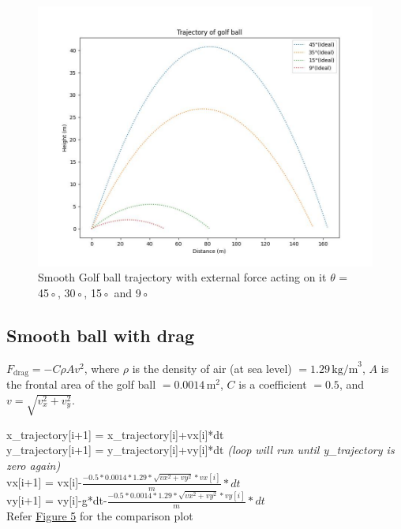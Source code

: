 \documentclass[11pt]{article}
\begin{document}
\begin{justify}
\begin{raggedright}
\begin{justify}
\end{justify}
\end{raggedright}

\begin{figure}[b]
    \centering
    \includegraphics[width=\textwidth, height=\textheight, keepaspectratio]{Golf_Trajectory_Ideal.jpeg}
    \caption{Smooth Golf ball trajectory with external force acting on it $\theta$ = 45◦, 30◦, 15◦ and 9◦}
    \label{fig:ideal_trajectory}
\end{figure}

\subsection{Smooth ball with drag}

\(F_{\text{drag}} = -C \rho A v^2\), 
where \(\rho\) is the density of air (at sea level) \(= 1.29 \, \text{kg/m}^3\), \(A\) is the frontal area of the golf ball \(= 0.0014 \, \text{m}^2\), \(C\) is a coefficient \(= 0.5\), and \(v = \sqrt{v_x^2 + v_y^2}\).
\begin{raggedright}
\begin{justify}
x\_trajectory[i+1] = x\_trajectory[i]+vx[i]*dt\\
y\_trajectory[i+1] = y\_trajectory[i]+vy[i]*dt \textit{(loop will run until y\_trajectory is zero again)}\\
vx[i+1] = vx[i]-$\frac{-0.5*0.0014*1.29*\sqrt{vx^2+vy^2}*vx[i]}{m}*dt$\\
vy[i+1] = vy[i]-g*dt-$\frac{-0.5*0.0014*1.29*\sqrt{vx^2+vy^2}*vy[i]}{m}*dt$\\
Refer \hyperref[fig:Smooth_Fdrag_trajectory]{Figure 5} for the comparison plot
\end{justify}
\end{raggedright}



\end{justify}
\end{document}
